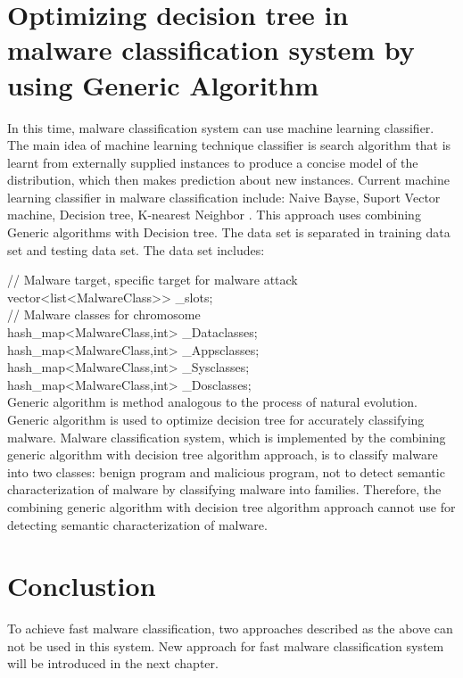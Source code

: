 \section{Optimizing decision tree in malware classification system by using Generic Algorithm}
In this time, malware classification system can use machine learning classifier. The main idea of machine learning technique classifier is search algorithm that is learnt from externally supplied instances to produce a concise model of the distribution, which then  makes prediction about new  instances. Current machine learning classifier in malware classification include: Naive Bayse, Suport Vector machine, Decision tree, K-nearest Neighbor \cite{mohd}. This approach uses combining Generic algorithms with Decision tree. The data set is separated in training data set and testing data set. The data set includes:

// Malware target, specific target for malware attack\\
vector<list<MalwareClass\*>> \_slots;\\
// Malware classes for chromosome\\
hash\_map<MalwareClass\*,int> \_Dataclasses;\\
hash\_map<MalwareClass\*,int> \_Appsclasses;\\
hash\_map<MalwareClass\*,int> \_Sysclasses;\\
hash\_map<MalwareClass\*,int> \_Dosclasses;\\

Generic algorithm is method analogous to the process of natural evolution. Generic algorithm is used to optimize decision tree for accurately classifying malware. Malware classification system, which is implemented by the combining generic algorithm with decision tree algorithm approach, is to classify malware into two classes: benign program and malicious program, not to detect semantic characterization of malware by classifying malware into families. Therefore, the combining generic algorithm with decision tree algorithm approach cannot use for detecting semantic characterization of malware.
\section{Conclustion}
To achieve fast malware classification, two approaches described as the above can not be used in this system. New approach for fast malware classification system will be introduced in the next chapter. 